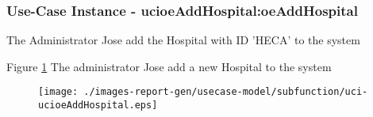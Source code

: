 \subsubsection{Use-Case Instance - ucioeAddHospital:oeAddHospital}

The Administrator Jose add the Hospital with ID 'HECA' to the system		  
\begin{operationmodel}

\end{operationmodel} 

Figure \ref{fig:lu.uni.lassy.excalibur.examples.icrash-RE-UC-uci-ucioeAddHospital}
The administrator Jose add a new Hospital to the system

\begin{figure}[htbp]
\begin{center}

\texttt{[image: ./images-report-gen/usecase-model/subfunction/uci-ucioeAddHospital.eps]}
\end{center}
\caption[lu.uni.lassy.excalibur.examples.icrash Sequence Diagram: uci-ucioeAddHospital]{}
\label{fig:lu.uni.lassy.excalibur.examples.icrash-RE-UC-uci-ucioeAddHospital}
\end{figure}
\vspace{0.5cm}
